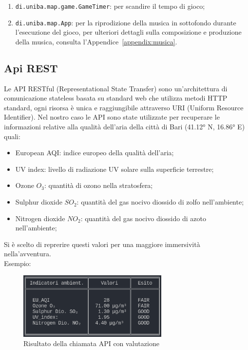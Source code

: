 \documentclass[italian,12pt,a4paper]{article}
\begin{document}
	\begin{enumerate}
		\item \texttt{di.uniba.map.game.GameTimer}: per scandire il tempo di gioco;
		\item \texttt{di.uniba.map.App}: per la riprodizione della musica in sottofondo durante l'esecuzione del gioco, per ulteriori dettagli sulla composizione e produzione della musica, consulta l'Appendice~\ref{appendix:musica}.
	\end{enumerate}
	
	\subsection{Api REST}
	Le API RESTful (Representational State Transfer) sono un'architettura di comunicazione stateless basata su standard web che utilizza metodi HTTP standard, ogni risorsa è unica e raggiungibile attraverso URI  (Uniform Resource Identifier).
	Nel nostro caso le API sono state utilizzate per recuperare le informazioni relative alla qualità dell'aria della città di Bari (41.12° N, 16.86° E) quali:

		\begin{itemize}
			\item European AQI: indice europeo della qualità dell'aria; 
			\item UV index: livello di radiazione UV solare sulla superficie terrestre;
			\item Ozone $O_3$: quantità di ozono nella stratosfera;
			\item Sulphur dioxide $SO_2$: quantità del gas nocivo diossido di zolfo nell'ambiente;
			\item Nitrogen dioxide $NO_2$: quantità del gas nocivo diossido di azoto nell'ambiente;
			
		\end{itemize}
	Si è scelto di reprerire questi valori per una maggiore immersività nella'avventura.\\
	Esempio:
	\begin{figure}[!h]
		\centering
		\includegraphics[width=7.5cm]{screen_api}
		\caption{Risultato della chiamata API con valutazione}
		\label{fig:screenapi}
	\end{figure}
	
\end{document}
